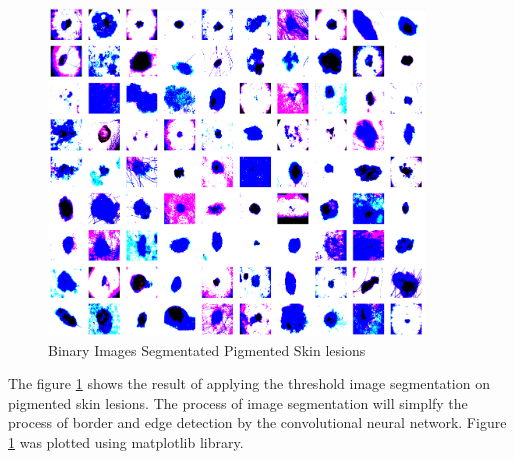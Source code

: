 \begin{figure}[!htp]
	\centering
	\includegraphics[width=10cm]{Images/aseg.png}
	\caption{Binary Images Segmentated Pigmented Skin lesions}
	\label{fig:after_seg}
\end{figure}

The figure \ref{fig:after_seg} shows the result of applying the threshold image segmentation on 
pigmented skin lesions. The process of image segmentation will simplfy the process of 
border and edge detection by the convolutional neural network. Figure \ref{fig:after_seg} was 
plotted using matplotlib library.
